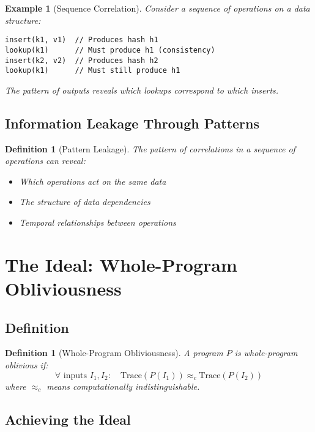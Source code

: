 \documentclass[11pt,final]{article}
\newtheorem{definition}[theorem]{Definition}
\newtheorem{example}[theorem]{Example}
\begin{document}
\begin{example}[Sequence Correlation]
Consider a sequence of operations on a data structure:
\begin{verbatim}
insert(k1, v1)  // Produces hash h1
lookup(k1)      // Must produce h1 (consistency)
insert(k2, v2)  // Produces hash h2
lookup(k1)      // Must still produce h1
\end{verbatim}
The pattern of outputs reveals which lookups correspond to which inserts.
\end{example}

\subsection{Information Leakage Through Patterns}

\begin{definition}[Pattern Leakage]
The pattern of correlations in a sequence of operations can reveal:
\begin{itemize}
    \item Which operations act on the same data
    \item The structure of data dependencies
    \item Temporal relationships between operations
\end{itemize}
\end{definition}

\section{The Ideal: Whole-Program Obliviousness}

\subsection{Definition}

\begin{definition}[Whole-Program Obliviousness]
A program $P$ is whole-program oblivious if:
\begin{equation}
\forall \text{ inputs } I_1, I_2: \quad \text{Trace}(P(I_1)) \approx_c \text{Trace}(P(I_2))
\end{equation}
where $\approx_c$ means computationally indistinguishable.
\end{definition}

\subsection{Achieving the Ideal}
\end{document}

